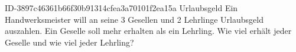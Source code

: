 \begin{exercise}
      {ID-3897c46361b66f30b91314cfea3a70101f2ea15a}
      {Urlaubsgeld}
  \ifproblem\problem
    Ein Handwerksmeister will an seine 3 Gesellen und 2 Lehrlinge 
    Urlaubsgeld auszahlen. Ein Geselle soll  mehr erhalten als ein
    Lehrling. Wie viel erhält jeder Geselle und wie viel jeder Lehrling?
  \fi
\end{exercise}
